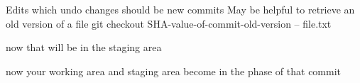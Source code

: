 Edits which undo changes should be new commits 
May be helpful to retrieve an old version of a file 
  git checkout SHA-value-of-commit-old-version -- file.txt 

  now that will be in the staging area 

  now your working area and staging area become in the phase of that commit 